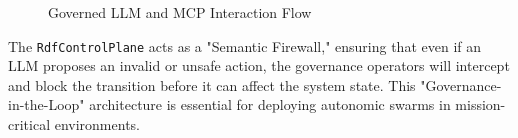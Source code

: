 \begin{figure}[h]
\centering
{}
\caption{Governed LLM and MCP Interaction Flow}
\end{figure}

The \texttt{RdfControlPlane} acts as a "Semantic Firewall," ensuring that even if an LLM proposes an invalid or unsafe action, the governance operators will intercept and block the transition before it can affect the system state. This "Governance-in-the-Loop" architecture is essential for deploying autonomic swarms in mission-critical environments.
